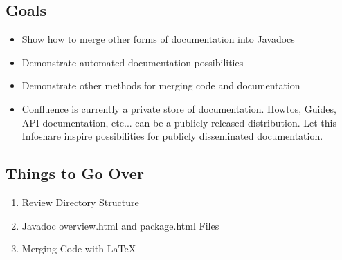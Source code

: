 \documentclass[12pt,notitlepage]{article}
\author{Leo Przybylski \\
\texttt{przybyls@u.arizona.edu}}
\begin{document}
  \W \begin{s5presentation}
    \maketitle
    \begin{ifhtml}
      \begin{s5slide}
        \section{Goals}
        \begin{itemize}
          \item Show how to merge other forms of documentation into Javadocs
          \item Demonstrate automated documentation possibilities
          \item Demonstrate other methods for merging code and documentation
          \item Confluence is currently a private store of documentation. Howtos, Guides, API 
            documentation, etc... can be a publicly released distribution. Let this Infoshare
            inspire possibilities for publicly disseminated documentation.
        \end{itemize}
      \end{s5slide}

      \begin{s5slide}
        \section{Things to Go Over}
        \begin{enumerate}
          \item Review Directory Structure
          \item Javadoc overview.html and package.html Files
          \item Merging Code with \LaTeX
        \end{enumerate}
      \end{s5slide}

      \begin{s5slide}

\end{s5slide}
\end{ifhtml}
\end{s5presentation}
\end{document}
